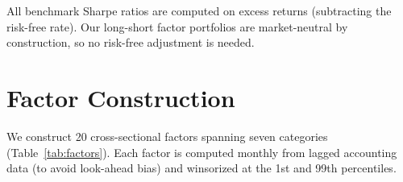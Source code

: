 \documentclass[12pt,a4paper]{article}
\begin{document}
All benchmark Sharpe ratios are computed on excess returns (subtracting the risk-free rate). Our long-short factor portfolios are market-neutral by construction, so no risk-free adjustment is needed.

\section{Factor Construction}
\label{sec:factors}

We construct 20 cross-sectional factors spanning seven categories (Table~\ref{tab:factors}). Each factor is computed monthly from lagged accounting data (to avoid look-ahead bias) and winsorized at the 1st and 99th percentiles.
\end{document}
